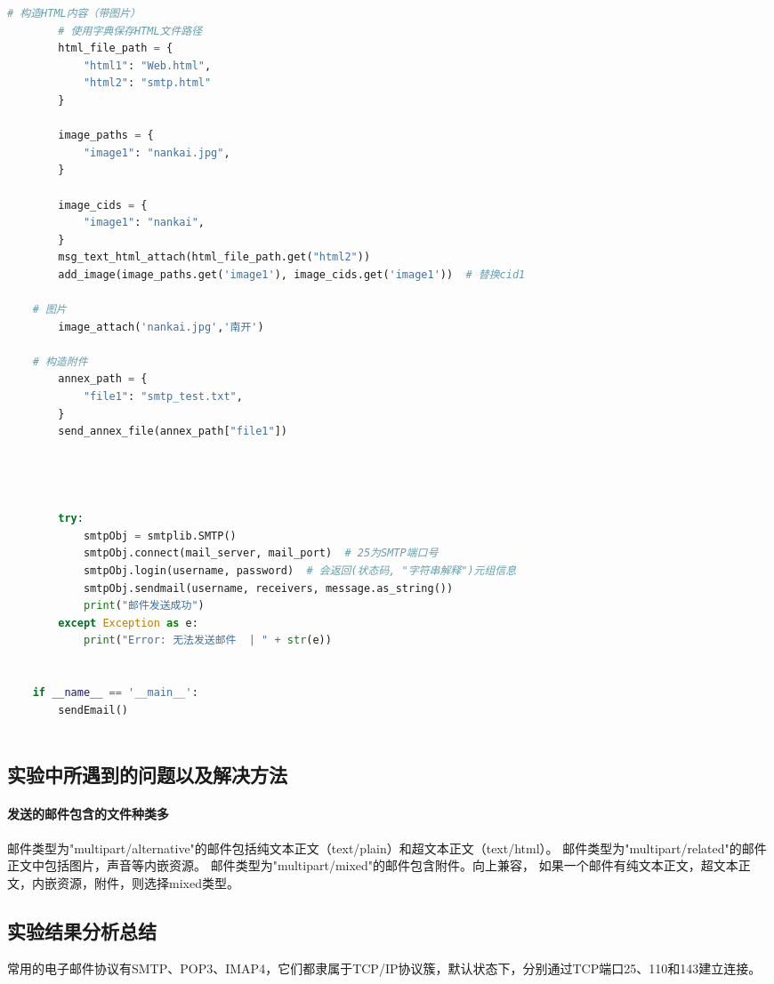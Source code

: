 \documentclass[a4paper,12pt]{report}
\begin{document}
\begin{spacing}{1.5}
\begin{spacing}{1}
\begin{lstlisting}[language={Python}]
        # 构造HTML内容（带图片）
        # 使用字典保存HTML文件路径
        html_file_path = {
            "html1": "Web.html",
            "html2": "smtp.html"
        }
    
        image_paths = {
            "image1": "nankai.jpg",
        }
    
        image_cids = {
            "image1": "nankai",
        }
        msg_text_html_attach(html_file_path.get("html2"))
        add_image(image_paths.get('image1'), image_cids.get('image1'))  # 替换cid1
    
    # 图片
        image_attach('nankai.jpg','南开')
    
    # 构造附件
        annex_path = {
            "file1": "smtp_test.txt",
        }
        send_annex_file(annex_path["file1"])
    
    
    
    
        try:
            smtpObj = smtplib.SMTP()
            smtpObj.connect(mail_server, mail_port)  # 25为SMTP端口号
            smtpObj.login(username, password)  # 会返回(状态码, "字符串解释")元组信息
            smtpObj.sendmail(username, receivers, message.as_string())
            print("邮件发送成功")
        except Exception as e:
            print("Error: 无法发送邮件  | " + str(e))
    
    
    if __name__ == '__main__':
        sendEmail()
    
		\end{lstlisting}
\end{spacing}
\subsection{实验中所遇到的问题以及解决方法}
\paragraph*{发送的邮件包含的文件种类多}
邮件类型为"multipart/alternative"的邮件包括纯文本正文（text/plain）和超文本正文（text/html）。
    邮件类型为"multipart/related"的邮件正文中包括图片，声音等内嵌资源。
    邮件类型为"multipart/mixed"的邮件包含附件。向上兼容，
    如果一个邮件有纯文本正文，超文本正文，内嵌资源，附件，则选择mixed类型。


\subsection{实验结果分析总结}
常用的电子邮件协议有SMTP、POP3、IMAP4，它们都隶属于TCP/IP协议簇，默认状态下，分别通过TCP端口25、110和143建立连接。


\end{spacing}
\end{document}
